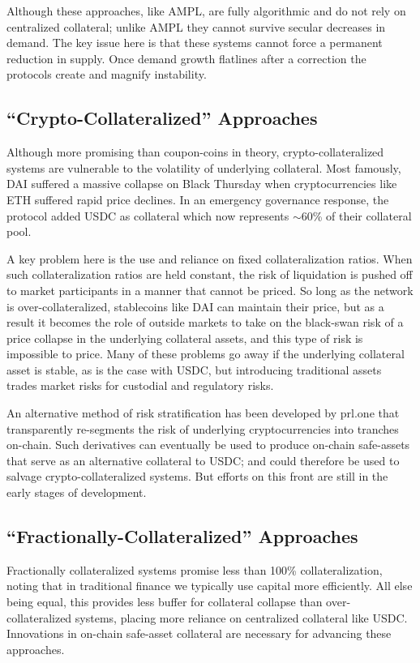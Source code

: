 \documentclass[11pt]{article}
\begin{document}
Although these approaches, like AMPL, are fully algorithmic and do not rely on centralized
collateral; unlike AMPL they cannot survive secular decreases in demand. The key issue here
is that these systems cannot force a permanent reduction in supply. Once demand growth
flatlines after a correction the protocols create and magnify instability.

\subsection{``Crypto-Collateralized'' Approaches}

Although more promising than coupon-coins in theory, crypto-collateralized systems are
vulnerable to the volatility of underlying collateral. Most famously, DAI suffered a massive
collapse on Black Thursday when cryptocurrencies like ETH suffered rapid price declines. In
an emergency governance response, the protocol added USDC as collateral which now represents
$\sim$60\% of their collateral pool.

A key problem here is the use and reliance on fixed collateralization ratios. When such
collateralization ratios are held constant, the risk of liquidation is pushed off to market
participants in a manner that cannot be priced. So long as the network is over-collateralized,
stablecoins like DAI can maintain their price, but as a result it becomes the role of outside
markets to take on the black-swan risk of a price collapse in the underlying collateral assets,
and this type of risk is impossible to price. Many of these problems go away if the underlying
collateral asset is stable, as is the case with USDC, but introducing traditional assets
trades market risks for custodial and regulatory risks.

An alternative method of risk stratification has been developed by prl.one that transparently
re-segments the risk of underlying cryptocurrencies into tranches on-chain. Such derivatives
can eventually be used to produce on-chain safe-assets that serve as an alternative collateral
to USDC; and could therefore be used to salvage crypto-collateralized systems. But efforts on
this front are still in the early stages of development.

\subsection{``Fractionally-Collateralized'' Approaches}

Fractionally collateralized systems promise less than 100\% collateralization, noting that in
traditional finance we typically use capital more efficiently. All else being equal, this
provides less buffer for collateral collapse than over-collateralized systems, placing more
reliance on centralized collateral like USDC. Innovations in on-chain safe-asset collateral
are necessary for advancing these approaches.
\end{document}
